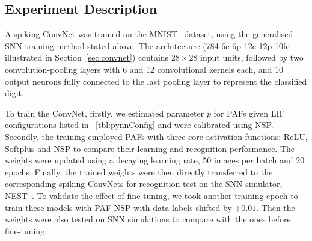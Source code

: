 	\subsection{Experiment Description}
	\label{subsec:expDesr}
	A spiking ConvNet was trained on the MNIST~\citep{lecun1998gradient} dataset, 
	using the generalised SNN training method stated above.
	The architecture (784-6c-6p-12c-12p-10fc illustrated in Section~\ref{sec:convnet}) contains $28\times28$ input units, followed by two convolution-pooling layers with 6 and 12 convolutional kernels each, and 10 output neurons fully connected to the last pooling layer to represent the classified digit.

	To train the ConvNet, firstly, we estimated parameter $p$ for PAFs given LIF configurations listed in \DIFdelbegin {}\DIFdelend \DIFaddbegin {}\DIFaddend ~\ref{tbl:pynnConfig} and \DIFdelbegin {}\DIFdelend \DIFaddbegin {}\DIFaddend were calibrated using NSP. 
	Secondly, the training employed PAFs with three core activation functions: ReLU, Softplus and NSP to compare their learning and recognition performance.
	The weights were updated using a decaying learning rate, 50 images per batch and 20 epochs.
	Finally, the trained weights were then directly transferred to the corresponding spiking ConvNets for recognition test on the SNN simulator, NEST~\citep{gewaltig2007nest}.
	To validate the effect of fine tuning, we took another training epoch to train these models with PAF-NSP with data labels shifted by $+0.01$.
	Then the weights were also tested on SNN simulations to compare with the ones before fine-tuning.

